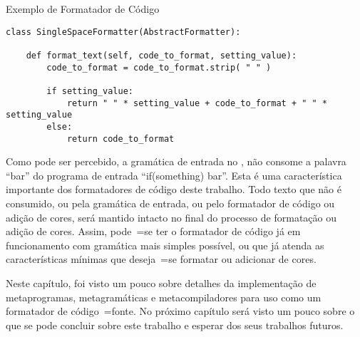 \begin{quadro}[!htb]
\begin{bluebox}
\begin{code}
\label{exemploDeFormatadorDeCodigo}
\caption{Exemplo de Formatador de Código}
\begin{verbatim}
class SingleSpaceFormatter(AbstractFormatter):

    def format_text(self, code_to_format, setting_value):
        code_to_format = code_to_format.strip( " " )

        if setting_value:
            return " " * setting_value + code_to_format + " " * setting_value
        else:
            return code_to_format
\end{verbatim}
\end{code}
\end{bluebox}
\end{quadro}

Como pode ser percebido,
a gramática de entrada no ,
não consome a palavra ``bar'' do programa de entrada ``if(something) bar''.
Esta é uma característica importante dos formatadores de código deste trabalho.
Todo texto que não é consumido,
ou pela gramática de entrada,
ou pelo formatador de código ou
adição de cores,
será mantido intacto no final do processo de formatação ou
adição de cores.
Assim,
pode~=se ter o formatador de código já em funcionamento com gramática mais simples possível,
ou que já atenda as características mínimas que deseja~=se formatar ou
adicionar de cores.

Neste capítulo,
foi visto um pouco sobre detalhes da implementação de metaprogramas,
metagramáticas e
metacompiladores para uso como um formatador de código~=fonte.
No próximo capítulo será visto um pouco sobre o que se pode concluir sobre este trabalho e
esperar dos seus trabalhos futuros.
